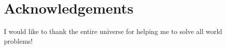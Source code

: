 \chapter*{Acknowledgements}

I would like to thank the entire universe for helping me to solve all world problems!
